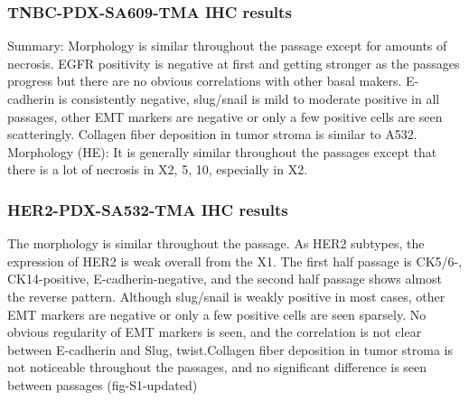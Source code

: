 \documentclass{article}
\begin{document}
\subsubsection{TNBC-PDX-SA609-TMA IHC results}
Summary: Morphology is similar throughout the passage except for amounts of necrosis. EGFR positivity is negative at first and getting stronger as the passages progress but there are no obvious correlations with other basal makers.
E-cadherin is consistently negative, slug/snail is mild to moderate positive in all passages, other EMT markers are negative or only a few positive cells are seen scatteringly. Collagen fiber deposition in tumor stroma is similar to A532.
Morphology (HE): It is generally similar throughout the passages except that there is a lot of necrosis in X2, 5, 10, especially in X2.
\subsubsection{HER2-PDX-SA532-TMA IHC results}
The morphology is similar throughout the passage. As HER2 subtypes, the expression of HER2 is weak overall from the X1. The first half passage is CK5/6-, CK14-positive, E-cadherin-negative, and the second half passage shows almost the reverse pattern. Although slug/snail is weakly positive in most cases, other EMT markers are negative or only a few positive cells are seen sparsely. No obvious regularity of EMT markers is seen, and the correlation is not clear between E-cadherin and Slug, twist.Collagen fiber deposition in tumor stroma is not noticeable throughout the passages, and no significant difference is seen between passages (fig-S1-updated)
\end{document}
